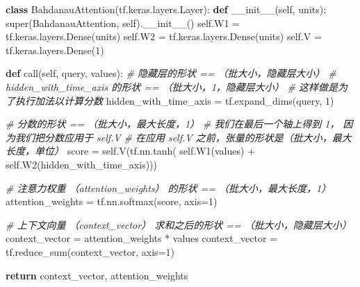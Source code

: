 \documentclass[
]{article}
\newenvironment{Shaded}{}{}
\newcommand{\BuiltInTok}[1]{#1}
\newcommand{\CommentTok}[1]{\textcolor[rgb]{0.38,0.63,0.69}{\textit{#1}}}
\newcommand{\ControlFlowTok}[1]{\textcolor[rgb]{0.00,0.44,0.13}{\textbf{#1}}}
\newcommand{\DecValTok}[1]{\textcolor[rgb]{0.25,0.63,0.44}{#1}}
\newcommand{\FunctionTok}[1]{\textcolor[rgb]{0.02,0.16,0.49}{#1}}
\newcommand{\KeywordTok}[1]{\textcolor[rgb]{0.00,0.44,0.13}{\textbf{#1}}}
\newcommand{\NormalTok}[1]{#1}
\newcommand{\OperatorTok}[1]{\textcolor[rgb]{0.40,0.40,0.40}{#1}}
\newcommand{\VariableTok}[1]{\textcolor[rgb]{0.10,0.09,0.49}{#1}}
\begin{document}
\begin{Shaded}
\begin{Highlighting}[]
\KeywordTok{class}\NormalTok{ BahdanauAttention(tf.keras.layers.Layer):}
    \KeywordTok{def} \FunctionTok{\_\_init\_\_}\NormalTok{(}\VariableTok{self}\NormalTok{, units):}
        \BuiltInTok{super}\NormalTok{(BahdanauAttention, }\VariableTok{self}\NormalTok{).}\FunctionTok{\_\_init\_\_}\NormalTok{()}
        \VariableTok{self}\NormalTok{.W1 }\OperatorTok{=}\NormalTok{ tf.keras.layers.Dense(units)}
        \VariableTok{self}\NormalTok{.W2 }\OperatorTok{=}\NormalTok{ tf.keras.layers.Dense(units)}
        \VariableTok{self}\NormalTok{.V }\OperatorTok{=}\NormalTok{ tf.keras.layers.Dense(}\DecValTok{1}\NormalTok{)}

    \KeywordTok{def}\NormalTok{ call(}\VariableTok{self}\NormalTok{, query, values):}
        \CommentTok{\# 隐藏层的形状 == （批大小，隐藏层大小）}
        \CommentTok{\# hidden\_with\_time\_axis 的形状 == （批大小，1，隐藏层大小）}
        \CommentTok{\# 这样做是为了执行加法以计算分数}
\NormalTok{        hidden\_with\_time\_axis }\OperatorTok{=}\NormalTok{ tf.expand\_dims(query, }\DecValTok{1}\NormalTok{)}

        \CommentTok{\# 分数的形状 == （批大小，最大长度，1）}
        \CommentTok{\# 我们在最后一个轴上得到 1， 因为我们把分数应用于 self.V}
        \CommentTok{\# 在应用 self.V 之前，张量的形状是（批大小，最大长度，单位）}
\NormalTok{        score }\OperatorTok{=} \VariableTok{self}\NormalTok{.V(tf.nn.tanh(}
            \VariableTok{self}\NormalTok{.W1(values) }\OperatorTok{+} \VariableTok{self}\NormalTok{.W2(hidden\_with\_time\_axis)))}

        \CommentTok{\# 注意力权重 （attention\_weights） 的形状 == （批大小，最大长度，1）}
\NormalTok{        attention\_weights }\OperatorTok{=}\NormalTok{ tf.nn.softmax(score, axis}\OperatorTok{=}\DecValTok{1}\NormalTok{)}

        \CommentTok{\# 上下文向量 （context\_vector） 求和之后的形状 == （批大小，隐藏层大小）}
\NormalTok{        context\_vector }\OperatorTok{=}\NormalTok{ attention\_weights }\OperatorTok{*}\NormalTok{ values}
\NormalTok{        context\_vector }\OperatorTok{=}\NormalTok{ tf.reduce\_sum(context\_vector, axis}\OperatorTok{=}\DecValTok{1}\NormalTok{)}

        \ControlFlowTok{return}\NormalTok{ context\_vector, attention\_weights}
\end{Highlighting}
\end{Shaded}
\end{document}
